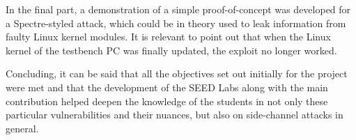 \documentclass[conference]{IEEEtran}
\begin{document}
In the final part, a demonstration of a simple proof-of-concept was developed for a Spectre-styled attack, which could be in theory used to leak information from faulty Linux kernel modules. It is relevant to point out that when the Linux kernel of the testbench PC was finally updated, the exploit no longer worked. 

Concluding, it can be said that all the objectives set out initially for the project were met and that the development of the SEED Labs along with the main contribution helped deepen the knowledge of the students in not only these particular vulnerabilities and their nuances, but also on side-channel attacks in general. 




%
%
%




\end{document}
